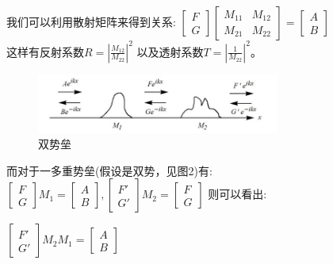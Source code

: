 \documentclass[12pt, a4paper, oneside]{ctexart}
\begin{document}
\begin{spacing}{2.0}
我们可以利用散射矩阵\cite{griffiths_schroeter_2018}\cite{RN05}来得到关系:
$\begin{bmatrix}
    F\\
    G
  \end{bmatrix}
  \begin{bmatrix}
   M_{11} &M_{12} \\
   M_{21} &M_{22}
  \end{bmatrix}
  =\begin{bmatrix}
    A\\
    B
  \end{bmatrix}$\\
这样有反射系数$R=\left | \frac{M_{12}}{M_{22}} \right |^2 $
以及透射系数$T=\left|\frac{1}{M_{22}}\right|^2$。\\
\begin{figure}[htbp]
    \centering
    \includegraphics[width=8cm]{double potential.jpg}
    \caption{双势垒}
\end{figure}

而对于一多重势垒(假设是双势，见图2)有:
$\begin{bmatrix}
    F\\
    G
  \end{bmatrix}
  M_1
  =\begin{bmatrix}
    A\\
    B
  \end{bmatrix},
  \begin{bmatrix}
    F'\\
    G'
  \end{bmatrix}
  M_2
  =\begin{bmatrix}
    F\\
    G
  \end{bmatrix}
$
则可以看出:\\
\begin{center}
  $
\begin{bmatrix}
    F'\\
    G'
  \end{bmatrix}
  M_2 M_1
  =\begin{bmatrix}
    A\\
    B
  \end{bmatrix}
$\\
\end{center}


\end{spacing}
\end{document}
